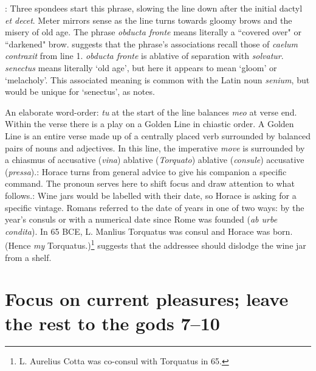 : Three spondees start this phrase, slowing the line down after the initial dactyl \textit{et decet}.  Meter mirrors sense as the line turns towards gloomy brows and the misery of old age.  The phrase \textit{obducta fronte} means literally a ``covered over" or ``darkened" brow.  \citet[217]{mankin1995} suggests that the phrase's associations recall those of \textit{caelum contraxit} from line 1.  \textit{obducta fronte} is ablative of separation with \textit{solvatur}.  \textit{senectus} means literally `old age', but here it appears to mean `gloom' or `melacholy'.  This associated meaning is common with the Latin noun \textit{senium}, but would be unique for `senectus', as \citet[217]{mankin1995} notes.


An elaborate word-order: \textit{tu} at the start of the line balances \textit{meo} at verse end. Within the verse there is a play on a Golden Line in chiastic order.  A Golden Line is an entire verse made up of a centrally placed verb surrounded by balanced pairs of nouns and adjectives.  In this line, the imperative \textit{move} is surrounded by a chiasmus of accusative (\textit{vina}) ablative (\textit{Torquato}) ablative (\textit{consule}) accusative (\textit{pressa}).\indent{}: Horace turns from general advice to give his companion a specific command.  The pronoun serves here to shift focus and draw attention to what follows.\indent{}: Wine jars would be labelled with their date, so Horace is asking for a specific vintage.  Romans referred to the date of years in one of two ways: by the year's consuls or with a numerical date since Rome was founded (\textit{ab urbe condita}).  In 65 BCE, L. Manlius Torquatus was consul and Horace was born.  (Hence \textit{my} Torquatus.)\footnote{L. Aurelius Cotta was co-consul with Torquatus in 65.}\indent{} suggests that the addressee should dislodge the wine jar from a shelf.


\section*{Focus on current pleasures; leave the rest to the gods 7--10}


